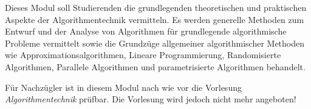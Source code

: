 \begin{module}
\begin{content}
Dieses Modul soll Studierenden die grundlegenden theoretischen und praktischen Aspekte der Algorithmentechnik vermitteln. Es werden generelle Methoden zum Entwurf und der Analyse von Algorithmen für grundlegende algorithmische Probleme vermittelt sowie die Grundzüge allgemeiner algorithmischer Methoden wie Approximationsalgorithmen, Lineare Programmierung, Randomisierte Algorithmen, Parallele Algorithmen und parametrisierte Algorithmen behandelt.


\end{content}

\begin{remarks}Für Nachzügler ist in diesem Modul nach wie vor die Vorlesung \emph{Algorithmentechnik} prüfbar. Die Vorlesung wird jedoch nicht mehr angeboten!

\end{remarks}

\end{module}


